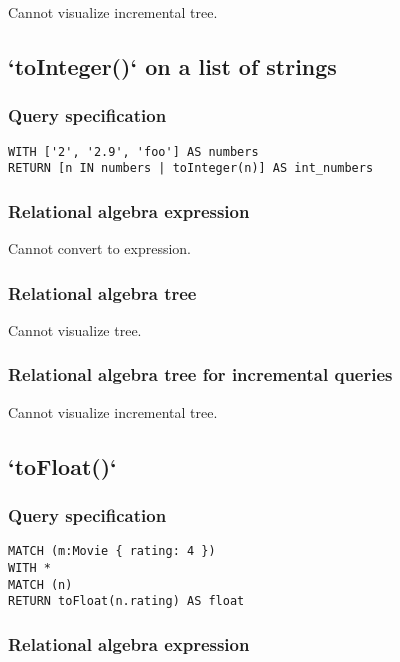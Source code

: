 Cannot visualize incremental tree.

\subsection{`toInteger()` on a list of strings}

\subsubsection*{Query specification}

\begin{lstlisting}
WITH ['2', '2.9', 'foo'] AS numbers
RETURN [n IN numbers | toInteger(n)] AS int_numbers
\end{lstlisting}

\subsubsection*{Relational algebra expression}

Cannot convert to expression.

\subsubsection*{Relational algebra tree}

Cannot visualize tree.

\subsubsection*{Relational algebra tree for incremental queries}

Cannot visualize incremental tree.

\subsection{`toFloat()`}

\subsubsection*{Query specification}

\begin{lstlisting}
MATCH (m:Movie { rating: 4 })
WITH *
MATCH (n)
RETURN toFloat(n.rating) AS float
\end{lstlisting}

\subsubsection*{Relational algebra expression}

